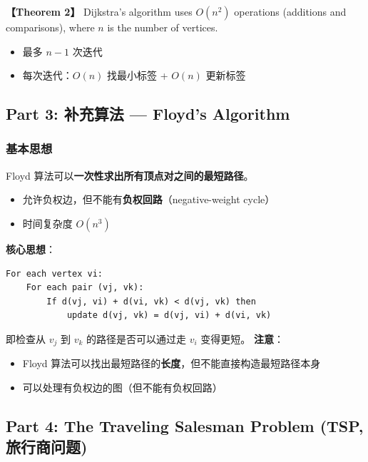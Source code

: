 \documentclass[10pt,a4paper,openany]{ctexbook}
\theoremstyle{definition}
\theoremstyle{remark}
\begin{document}
\textbf{【Theorem 2】} Dijkstra's algorithm uses \textbf{$O(n^2)$} operations (additions and comparisons), where $n$ is the number of vertices.
\begin{itemize}
\item 最多 $n-1$ 次迭代
\item 每次迭代：$O(n)$ 找最小标签 + $O(n)$ 更新标签

\end{itemize}

\vspace{-2pt}

\subsection{Part 3: 补充算法 — Floyd's Algorithm}

\subsubsection{基本思想}

Floyd 算法可以\textbf{一次性求出所有顶点对之间的最短路径}。
\begin{itemize}
\item 允许负权边，但不能有\textbf{负权回路}（negative-weight cycle）
\item 时间复杂度 $O(n^3)$

\end{itemize}

\textbf{核心思想}：
{\footnotesize\begin{verbatim}
For each vertex vi:
    For each pair (vj, vk):
        If d(vj, vi) + d(vi, vk) < d(vj, vk) then
            update d(vj, vk) = d(vj, vi) + d(vi, vk)
\end{verbatim}}

即检查从 $v_j$ 到 $v_k$ 的路径是否可以通过走 $v_i$ 变得更短。
\textbf{注意}：
\begin{itemize}
\item Floyd 算法可以找出最短路径的\textbf{长度}，但不能直接构造最短路径本身
\item 可以处理有负权边的图（但不能有负权回路）

\end{itemize}

\vspace{-2pt}

\subsection{Part 4: The Traveling Salesman Problem (TSP, 旅行商问题)}
\end{document}
